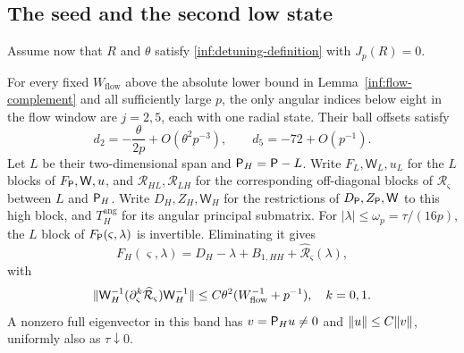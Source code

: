 \subsection{The seed and the second low state}

Assume now that $R$ and $\theta$ satisfy
\eqref{inf:detuning-definition} with $J_p(R)=0$.

\begin{lemma}\label{inf:flow-low-block}
For every fixed $W_{\mathrm{flow}}$ above the absolute lower bound in
Lemma~\ref{inf:flow-complement} and all sufficiently large
$p$, the only angular indices below eight in the flow window are
$j=2,5$, each with one radial state. Their ball offsets satisfy
\begin{equation}\label{inf:low-offsets}
 d_2=-\frac{\theta}{2p}+O(\theta^2p^{-3}),\qquad
 d_5=-72+O(p^{-1}).
\end{equation}
Let $L$ be their two-dimensional span and $\mathsf P_H=\mathsf P-L$.
Write $F_L,\mathsf W_L,u_L$ for the $L$ blocks of $F_\mathsf P,\mathsf W,u$,
and $\mathcal R_{HL},\mathcal R_{LH}$ for the corresponding off-diagonal
blocks of $\mathcal R_\varsigma$ between $L$ and $\mathsf P_H$.
Write $D_H,Z_H,\mathsf W_H$ for the restrictions of
$D_\mathsf P,Z_\mathsf P,\mathsf W$ to this high block, and
$T_H^{\mathrm{ang}}$ for its angular principal submatrix.
For $|\lambda|\le\omega_p=\tau/(16p)$, the $L$ block of
$F_\mathsf P(\varsigma,\lambda)$ is invertible. Eliminating it gives
\begin{equation}\label{inf:high-schur}
 F_H(\varsigma,\lambda)=D_H-\lambda+B_{1,HH}
                                      +\widehat{\mathcal R}_\varsigma(\lambda),
\end{equation}
with
\begin{equation}\label{inf:high-schur-remainder}
 \lVert \mathsf W_H^{-1}(\partial_\varsigma^k\widehat{\mathcal R}_\varsigma)
                         \mathsf W_H^{-1}\rVert
 \le C\theta^2(W_{\mathrm{flow}}^{-1}+p^{-1}),\quad k=0,1.
\end{equation}
A nonzero full eigenvector in this band has $v=\mathsf P_Hu\ne0$ and
$\lVert u\rVert\le C\lVert v\rVert$, uniformly also as $\tau\downarrow0$.
\end{lemma}
